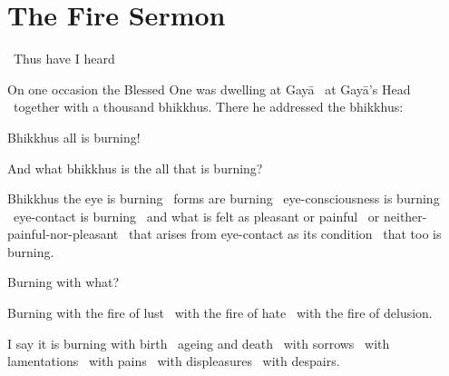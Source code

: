 \section{The Fire Sermon}
\label{fire-sermon}

\begin{leader-english}
  \anglebracketleft\ \hspace{-0.5mm}Thus have I heard \hspace{-0.5mm}\anglebracketright\
\end{leader-english}

\begin{english-only-hang}
  On one occasion\hyperlink{endnote113-appendix}{\hypertarget{endnote113-body}{}} the Blessed One was dwelling at Gayā \breathmark\ at Gayā's Head \breathmark\ together with a thousand bhikkhus. There he addressed the bhikkhus:
\end{english-only-hang}

\begin{english-only-hang}
  Bhikkhus all is burning!
\end{english-only-hang}

\begin{english-only-hang}
  And what bhikkhus is the all that is burning?
\end{english-only-hang}

\begin{english-only-hang}
  Bhikkhus the eye is burning \breathmark\ forms are burning \breathmark\ eye-consciousness is burning \breathmark\ eye-contact is burning \breathmark\ and what is felt as pleasant or painful \breathmark\ or neither-painful-nor-pleasant \breathmark\ that arises from eye-contact as its condition \breathmark\ that too is burning.
\end{english-only-hang}

\begin{english-only-hang}
  Burning with what?
\end{english-only-hang}

\begin{english-only-hang}
  Burning with the fire of lust \breathmark\ with the fire of hate \breathmark\ with the fire of delusion.
\end{english-only-hang}

\begin{english-only-hang}
  I say it is burning with birth \breathmark\ ageing and death \breathmark\ with sorrows \breathmark\ with lamentations \breathmark\ with pains \breathmark\ with displeasures \breathmark\ with despairs.
\end{english-only-hang}

